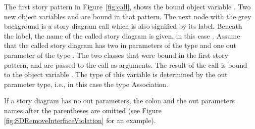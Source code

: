 The first story pattern in Figure~\ref{fig:call}, shows the bound object variable . Two new object variables  and  are bound in that pattern. The next node with the grey background is a story diagram call which is also signified by its label. Beneath the label, the name of the called story diagram is given, in this case . Assume that the called story diagram has two in parameters of the type  and one out parameter of the type . The two classes that were bound in the first story pattern,  and  are passed to the call as arguments.
The result of the call is bound to the object variable . The type of this variable is determined by the out parameter type, i.e., in this case the type Association.

If a story diagram has no out parameters, the colon and the out parameters names after the parentheses are omitted (see Figure \ref{fig:SDRemoveInterfaceViolation} for an example).

